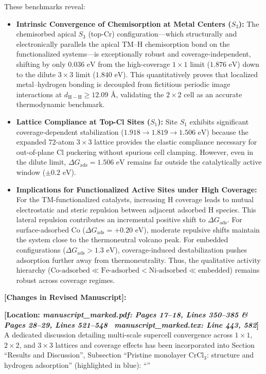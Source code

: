 \documentclass[11pt, sans, a4paper]{moderncv}
\newcommand{\manuscriptchange}[1]{{\renewcommand{\label}[1]{}\vspace{0.4em}\noindent\textbf{\color{acsblue}[Changes in Revised Manuscript]:}\par\nopagebreak\vspace{0.15em}#1\vspace{0.4em}}}
\begin{document}
These benchmarks reveal:
\begin{itemize}[leftmargin=1.5em, itemsep=0.2em]
\item \textbf{Intrinsic Convergence of Chemisorption at Metal Centers ($S_3$):} The chemisorbed apical $S_3$ (top-Cr) configuration—which structurally and electronically parallels the apical TM--H chemisorption bond on the functionalized systems—is exceptionally robust and coverage-independent, shifting by only $0.036\text{ eV}$ from the high-coverage $1\times 1$ limit ($1.876\text{ eV}$) down to the dilute $3\times 3$ limit ($1.840\text{ eV}$). This quantitatively proves that localized metal--hydrogen bonding is decoupled from fictitious periodic image interactions at $d_{\mathrm{H-H}} \ge 12.09\text{ \AA}$, validating the $2\times 2$ cell as an accurate thermodynamic benchmark.
\item \textbf{Lattice Compliance at Top-Cl Sites ($S_1$):} Site $S_1$ exhibits significant coverage-dependent stabilization ($1.918 \rightarrow 1.819 \rightarrow 1.506\text{ eV}$) because the expanded 72-atom $3\times 3$ lattice provides the elastic compliance necessary for out-of-plane Cl puckering without spurious cell clamping. However, even in the dilute limit, $\Delta G_{\mathrm{ads}} = 1.506\text{ eV}$ remains far outside the catalytically active window ($\pm 0.2\text{ eV}$).
\item \textbf{Implications for Functionalized Active Sites under High Coverage:} For the TM-functionalized catalysts, increasing H coverage leads to mutual electrostatic and steric repulsion between adjacent adsorbed H species. This lateral repulsion contributes an incremental positive shift to $\Delta G_{\mathrm{ads}}$. For surface-adsorbed Co ($\Delta G_{\mathrm{ads}} = +0.20\text{ eV}$), moderate repulsive shifts maintain the system close to the thermoneutral volcano peak. For embedded configurations ($\Delta G_{\mathrm{ads}} > 1.3\text{ eV}$), coverage-induced destabilization pushes adsorption further away from thermoneutrality. Thus, the qualitative activity hierarchy ($\text{Co-adsorbed} \ll \text{Fe-adsorbed} < \text{Ni-adsorbed} \ll \text{embedded}$) remains robust across coverage regimes.
\end{itemize}

\manuscriptchange{\textbf{[Location: \textit{manuscript\_marked.pdf: Pages 17--18, Lines 350--385 \& Pages 28--29, Lines 521--548} \textbar\ \textit{manuscript\_marked.tex: Line 443, 582}]}\\ A dedicated discussion detailing multi-scale supercell convergence across $1\times 1$, $2\times 2$, and $3\times 3$ lattices and coverage effects has been incorporated into Section ``Results and Discussion'', Subsection ``Pristine monolayer $\text{CrCl}_3$: structure and hydrogen adsorption'' (highlighted in blue): ``{\itshape \ExecuteMetaData[manuscript_marked.tex]{PristineGadsComparison}}''}
\end{document}
